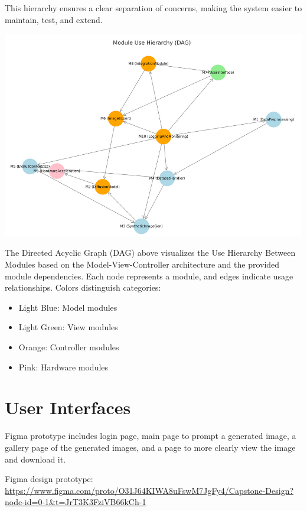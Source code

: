 \documentclass[12pt, titlepage]{article}
\begin{document}
This hierarchy ensures a clear separation of concerns, making the system easier to maintain, test, and extend.
\begin{center}
\includegraphics[width=\textwidth]{module_use_hierarchy}
\end{center}

The Directed Acyclic Graph (DAG) above visualizes the Use Hierarchy Between Modules based on the Model-View-Controller architecture and the provided module dependencies. Each node represents a module, and edges indicate usage relationships. Colors distinguish categories:
\begin{itemize}
\item Light Blue: Model modules
\item Light Green: View modules
\item Orange: Controller modules
\item Pink: Hardware modules
\end{itemize}

\section{User Interfaces}
Figma prototype includes login page, main page to prompt a generated image, a gallery page of the generated images, and a page to more clearly view the image and download it.

Figma design prototype:\\
\url{https://www.figma.com/proto/O31J64KIWA8uFswM7JgFy4/Capstone-Design?node-id=0-1&t=JrT3K3FziVB66kCh-1}
\end{document}
